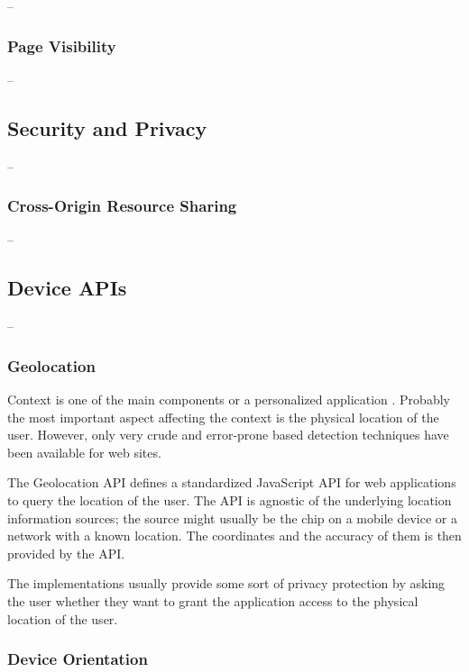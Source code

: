 --

\subsubsection{Page Visibility}

--

\subsection{Security and Privacy}

--

\subsubsection{Cross-Origin Resource Sharing}

--

\subsection{Device APIs}

--

\subsubsection{Geolocation}

Context is one of the main components or a personalized application
\cite{fling2009mobile}. Probably the most important aspect affecting
the context is the physical location of the user. However, only very
crude and error-prone  based detection techniques have been
available for web sites.

The Geolocation API defines a standardized JavaScript API for web
applications to query the location of the user. The API is agnostic of
the underlying location information sources; the source might usually
be the  chip on a mobile device or a  network
with a known location. The coordinates and the accuracy of them is
then provided by the API. \cite{geolocationAPI}

The implementations usually provide some sort of privacy protection by
asking the user whether they want to grant the application access to
the physical location of the user.

\subsubsection{Device Orientation}

